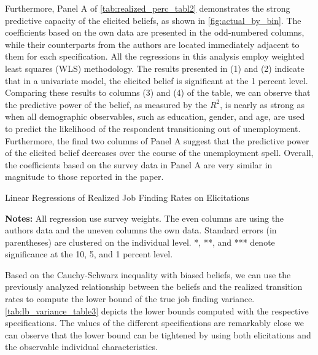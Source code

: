 \documentclass[11pt,a4paper,leqno]{article}
\begin{document}
Furthermore, Panel A of \autoref{tab:realized_perc_tabl2} demonstrates the strong predictive capacity of the elicited beliefs, as shown in \autoref{fig:actual_by_bin}. The coefficients based on the own data are presented in the odd-numbered columns, while their counterparts from the authors are located immediately adjacent to them for each specification. All the regressions in this analysis employ weighted least squares (WLS) methodology.
The results presented in (1) and (2) indicate that in a univariate model, the elicited belief is significant at the 1 percent level. Comparing these results to columns (3) and (4) of the table, we can observe that the predictive power of the belief, as measured by the $R^2$, is nearly as strong as when all demographic observables, such as education, gender, and age, are used to predict the likelihood of the respondent transitioning out of unemployment. Furthermore, the final two columns of Panel A suggest that the predictive power of the elicited belief decreases over the course of the unemployment spell. Overall, the coefficients based on the survey data in Panel A are very similar in magnitude to those reported in the paper.
\begin{table}[!htbp] \centering 
\tiny
\caption{Linear Regressions of Realized Job Finding Rates on Elicitations} 
\label{tab:realized_perc_tabl2}

\begin{minipage}[center]{0.9\textwidth}
	\caption*{\tiny \textbf{Notes:} All regression use survey weights. The even columns are using the authors data and the uneven columns the own data. 
		Standard errors (in parentheses) are clustered on the individual level. *, **, and *** denote significance at the 10, 5, and 1 percent level.}
\end{minipage}
\end{table}


Based on the Cauchy-Schwarz inequality with biased beliefs, we can use the previously analyzed relationship between the beliefs and the realized transition rates to compute the lower bound of the true job finding variance. \autoref{tab:lb_variance_table3} depicts the lower bounds computed with the respective specifications. The values of the different specifications are remarkably close we can observe that the lower bound can be tightened by using both elicitations and the observable individual characteristics. 
\end{document}
